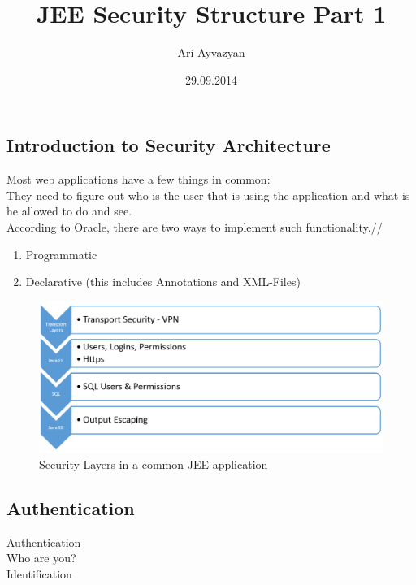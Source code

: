 \documentclass[12pt,a4paper]{report}
\date{29.09.2014}
\author{Ari Ayvazyan}
\title{JEE Security Structure Part 1}
\begin{document}
\maketitle
\tableofcontents


\chapter{\MyTitle}


\section{Introduction to Security Architecture}
Most web applications have a few things in common:\\
They need to figure out who is the user that is using the application and what is he allowed to do and see.\\
According to Oracle, there are two ways to implement such functionality.\cite{oracleDoc}//
\begin{enumerate}
	\item Programmatic
	\item Declarative (this includes Annotations and XML-Files)
\end{enumerate}


\begin{figure}[h]
\centering
\includegraphics[width=1\linewidth]{res/SecurityLayers}
\caption{Security Layers in a common JEE application}
\label{fig:SecurityLayers}
\end{figure}


\section{Authentication}
Authentication\\
Who are you?\\
Identification\\
\end{document}
